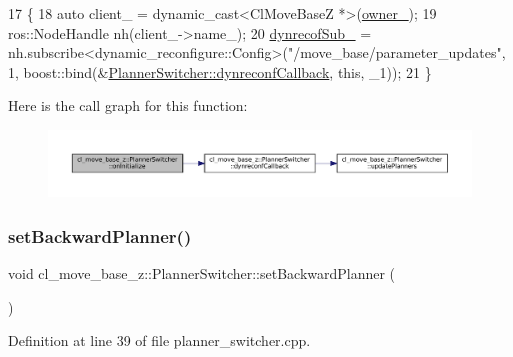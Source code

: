 \begin{DoxyCode}
17 \{
18   \textcolor{keyword}{auto} client\_ = \textcolor{keyword}{dynamic\_cast<}ClMoveBaseZ *\textcolor{keyword}{>}(\hyperlink{classsmacc_1_1ISmaccComponent_a909590e672450ce0eb0d8facb45c737a}{owner\_});
19   ros::NodeHandle nh(client\_->name\_);
20   \hyperlink{classcl__move__base__z_1_1PlannerSwitcher_ae902346f4f8e58241acc56cccaad8546}{dynrecofSub\_} = nh.subscribe<dynamic\_reconfigure::Config>(\textcolor{stringliteral}{"/move\_base/parameter\_updates"}, 1, 
      boost::bind(&\hyperlink{classcl__move__base__z_1_1PlannerSwitcher_ad9371bd8d62600ef874e8914c3ec177b}{PlannerSwitcher::dynreconfCallback}, \textcolor{keyword}{this}, \_1));
21 \}
\end{DoxyCode}
Here is the call graph for this function\+:
\nopagebreak
\begin{figure}[H]
\begin{center}
\leavevmode
\includegraphics[width=350pt]{classcl__move__base__z_1_1PlannerSwitcher_a36bc2b9788f03a1ca02b954c625ef4c5_cgraph}
\end{center}
\end{figure}
\mbox{\label{classcl__move__base__z_1_1PlannerSwitcher_a6995deff44418a0965e4e793de8c4857}} 
\subsubsection{\texorpdfstring{set\+Backward\+Planner()}{setBackwardPlanner()}}
{\footnotesize\ttfamily void cl\+\_\+move\+\_\+base\+\_\+z\+::\+Planner\+Switcher\+::set\+Backward\+Planner (\begin{DoxyParamCaption}{ }\end{DoxyParamCaption})}



Definition at line 39 of file planner\+\_\+switcher.\+cpp.



